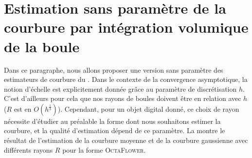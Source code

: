 \section{Estimation sans paramètre de la courbure par intégration volumique de la boule}
\label{sec:curvature:parameter-free}
%
Dans ce paragraphe, nous allons proposer une version sans paramètre des
estimateurs de courbure du . Dans le contexte
de la convergence asymptotique, la notion d'échelle est explicitement donnée
grâce au paramètre de discrétisation $h$. C'est d'ailleurs pour cela que nos
rayons de boules doivent être en relation avec $h$ ($R$ est en
$O(h^\frac{1}{3})$). Cependant, pour un objet digital donné, ce choix de rayon
nécessite d'étudier au préalable la forme dont nous souhaitons estimer la
courbure, et la qualité d'estimation dépend de ce paramètre. La
 montre le résultat de l'estimation de la
courbure moyenne et de la courbure gaussienne avec différents rayons $R$ pour la
forme \textsc{OctaFlower}.

